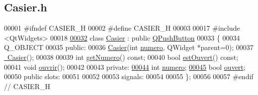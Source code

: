 \hypertarget{_casier_8h_source}{}\subsection{Casier.\+h}
\label{_casier_8h_source}

\begin{DoxyCode}
00001 \textcolor{preprocessor}{#ifndef CASIER\_H}
00002 \textcolor{preprocessor}{#define CASIER\_H}
00003 
00017 \textcolor{preprocessor}{#include <QtWidgets>}
00018 
\hyperlink{class_casier}{00032} \textcolor{keyword}{class }\hyperlink{class_casier}{Casier} : \textcolor{keyword}{public} \hyperlink{class_q_push_button}{QPushButton}
00033 \{
00034     Q\_OBJECT
00035 \textcolor{keyword}{public}:
00036     \hyperlink{class_casier_aed1cd4435ff913a68b69d8119481bb8f}{Casier}(\textcolor{keywordtype}{int} \hyperlink{class_casier_a17aa23e73b177559266a9fb17f63b812}{numero}, QWidget *parent=0);
00037     \hyperlink{class_casier_a4aebc2219ccd4612cf79413904bb9340}{~Casier}();
00038 
00039     \textcolor{keywordtype}{int} \hyperlink{class_casier_a061b024a2733a5bb1dfcc43bb0022707}{getNumero}() \textcolor{keyword}{const};
00040     \textcolor{keywordtype}{bool} \hyperlink{class_casier_ab26fd4da845423355835da8d445ed5dd}{estOuvert}() \textcolor{keyword}{const};
00041     \textcolor{keywordtype}{void} \hyperlink{class_casier_ac4b0de3ba58dc2bab52b049b278f4f90}{ouvrir}();
00042 
00043 \textcolor{keyword}{private}:
\hyperlink{class_casier_a17aa23e73b177559266a9fb17f63b812}{00044}     \textcolor{keywordtype}{int} \hyperlink{class_casier_a17aa23e73b177559266a9fb17f63b812}{numero};
\hyperlink{class_casier_afe544ed1a87ce714a9fbbe16126669e4}{00045}     \textcolor{keywordtype}{bool} \hyperlink{class_casier_afe544ed1a87ce714a9fbbe16126669e4}{ouvert};
00050 \textcolor{keyword}{public} slots:
00051 
00052 
00053 signals:
00054 
00055 \};
00056 
00057 \textcolor{preprocessor}{#endif // CASIER\_H}
\end{DoxyCode}

